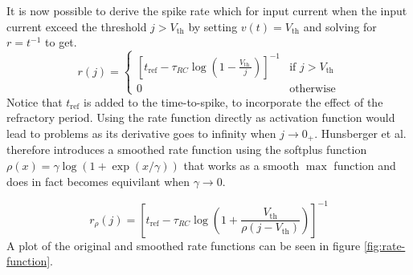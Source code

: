 \documentclass[a4paper,11pt]{article} %
\begin{document}
It is now possible to derive the spike rate which for input current 
when the input current exceed the threshold $j>V_\text{th}$ by setting $v(t) = V_\text{th}$ and solving for $r = t^{-1}$ to get.
\begin{equation}
  r(j) = \begin{cases} 
      \left[t_\text{ref} - \tau_{RC} \log \left(1-\frac{V_{\text {th }}}{j}\right) \right]^{-1} & \text{if } j > V_\text{th} \\
      0 & \text{otherwise}
  \end{cases}
\end{equation}
Notice that $t_\text{ref}$ is added to the time-to-spike, to incorporate the effect of the refractory period. Using the rate function directly as activation function would lead to problems as its derivative goes to infinity when $j \to 0_{+}$. Hunsberger et al. therefore introduces a smoothed rate function using the softplus function $\rho(x) = \gamma \log(1 + \exp(x / \gamma))$ that works as a smooth $\max$ function and does in fact becomes equivilant when $\gamma \to 0$.

\begin{equation} \label{eq:soft-rate}
  r_\rho(j) = \left[t_\text{ref} - \tau_{RC} \log \left(1 + \frac{ V_{\text{th}} }{ \rho(j - V_\text{th})}\right) \right]^{-1}
\end{equation}
A plot of the original and smoothed rate functions can be seen in figure \ref{fig:rate-function}.
\end{document}
